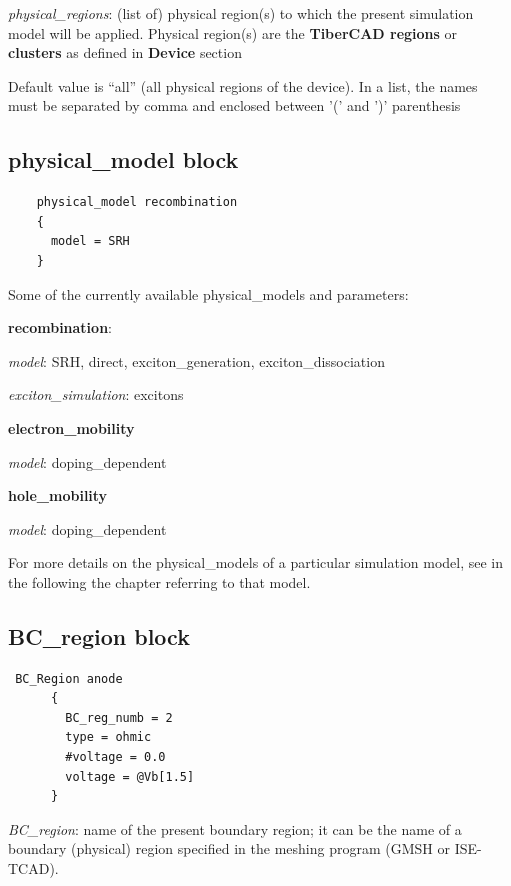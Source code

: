 \textit{physical\_regions}: (list of) physical region(s) to  which the  present simulation model will be  applied.
Physical region(s) are the  \textbf{TiberCAD regions} or  \textbf{clusters} as  defined in  \textbf{Device}  section 

Default value  is  "`all"' (all  physical regions of the  device).
In a list, the names must be separated by comma  and  enclosed between '(' and ')' parenthesis 


\subsection{physical\_model block }

\begin{verbatim}
    physical_model recombination
    {
      model = SRH
    }
\end{verbatim}


Some of the currently available physical\_models and parameters:

\textbf{recombination}:

\textit{model}:  SRH, direct, exciton\_generation,  exciton\_dissociation

\textit{exciton\_simulation}: excitons


\textbf{electron\_mobility}

\textit{model}: doping\_dependent

\textbf{hole\_mobility}

\textit{model}: doping\_dependent

For  more  details on  the  physical\_models  of a  particular simulation model,  see in the  following the chapter  referring to that model.    


\subsection{BC\_region block }
\label{section:BC}

\begin{verbatim}
 BC_Region anode
      {
        BC_reg_numb = 2
        type = ohmic
        #voltage = 0.0
        voltage = @Vb[1.5]
      }
\end{verbatim}




\textit{BC\_region}: name of the  present boundary  region; it  can  be  the  name  of a boundary (physical) region    specified in the meshing  program (GMSH or  ISE-TCAD). 

